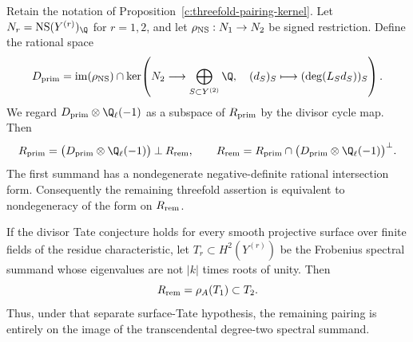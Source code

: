 \begin{corollary}
\label{c:threefold-divisor-split}
Retain the notation of Proposition~\ref{c:threefold-pairing-kernel}.
Let $N_r=\operatorname{NS}(Y^{(r)})_\Q$ for $r=1,2$,
and let $\rho_{\rm NS}:N_1\to N_2$ be signed restriction.
Define the rational space
\[
 D_{\rm prim}=
 \operatorname{im}(\rho_{\rm NS})\cap
 \ker\!\left(
 N_2\longrightarrow
 \bigoplus_{S\subset Y^{(2)}}\Q,\quad
 (d_S)_S\longmapsto(\deg(L_Sd_S))_S
 \right).
\]
We regard $D_{\rm prim}\otimes\Q_\ell(-1)$ as a subspace of
$R_{\rm prim}$ by the divisor cycle map.  Then
\[
 R_{\rm prim}
 =\bigl(D_{\rm prim}\otimes\Q_\ell(-1)\bigr)
   \mathbin{\perp}R_{\rm rem},
 \qquad
 R_{\rm rem}=
 R_{\rm prim}\cap
       \bigl(D_{\rm prim}\otimes\Q_\ell(-1)\bigr)^\perp .
\]
The first summand has a nondegenerate negative-definite
rational intersection form.  Consequently the remaining
threefold assertion is equivalent to nondegeneracy of the
form on $R_{\rm rem}$.

If the divisor Tate conjecture holds for every smooth
projective surface over finite fields of the residue
characteristic, let
$T_r\subset H^2(Y^{(r)})$ be the Frobenius spectral summand
whose eigenvalues are not $|k|$ times roots of unity.
Then
\[
 R_{\rm rem}=\rho_A(T_1)\subset T_2.
\]
Thus, under that separate surface-Tate hypothesis, the
remaining pairing is entirely on the image of the
transcendental degree-two spectral summand.
\end{corollary}

